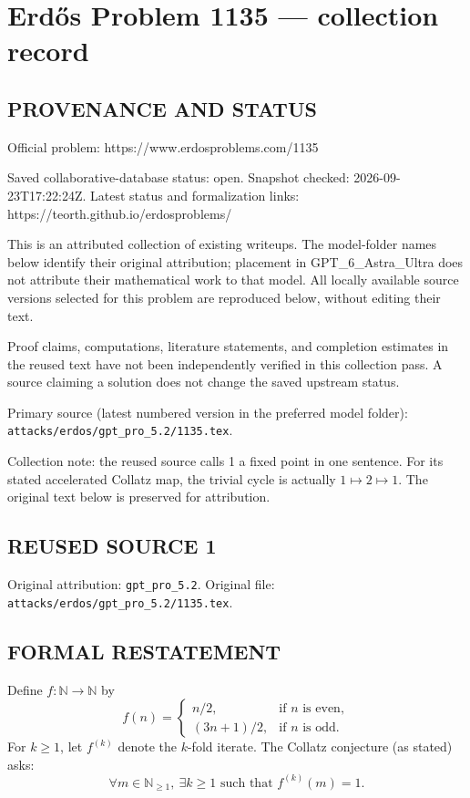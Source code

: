 \section*{Erd\H{o}s Problem 1135 --- collection record}

\subsection*{PROVENANCE AND STATUS}
Official problem: https://www.erdosproblems.com/1135

Saved collaborative-database status: open.
Snapshot checked: 2026-09-23T17:22:24Z.
Latest status and formalization links: https://teorth.github.io/erdosproblems/

This is an attributed collection of existing writeups. The model-folder names below identify their original attribution; placement in GPT\_6\_Astra\_Ultra does not attribute their mathematical work to that model. All locally available source versions selected for this problem are reproduced below, without editing their text.

Proof claims, computations, literature statements, and completion estimates in the reused text have not been independently verified in this collection pass. A source claiming a solution does not change the saved upstream status.

Primary source (latest numbered version in the preferred model folder): \texttt{attacks/erdos/gpt\_pro\_5.2/1135.tex}.

Collection note: the reused source calls 1 a fixed point in one sentence. For its stated accelerated Collatz map, the trivial cycle is actually $1\mapsto2\mapsto1$. The original text below is preserved for attribution.

\subsection*{REUSED SOURCE 1}
Original attribution: \texttt{gpt\_pro\_5.2}.
Original file: \texttt{attacks/erdos/gpt\_pro\_5.2/1135.tex}.


\subsection*{FORMAL RESTATEMENT}
Define $f:\mathbb{N}\to\mathbb{N}$ by
\[
 f(n)=\begin{cases}
 n/2,&\text{if $n$ is even},\\
 (3n+1)/2,&\text{if $n$ is odd}.
 \end{cases}
\]
For $k\ge 1$, let $f^{(k)}$ denote the $k$-fold iterate.
The Collatz conjecture (as stated) asks:
\[
\forall m\in\mathbb{N}_{\ge 1},\ \exists k\ge 1\text{ such that } f^{(k)}(m)=1.
\]

